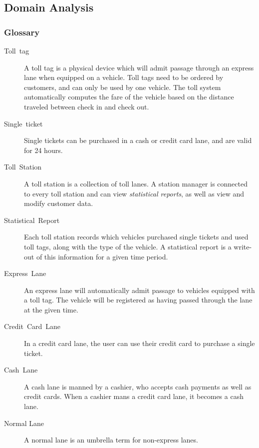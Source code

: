 \subsection {Domain Analysis}

\subsubsection {Glossary}

\begin{description}
\item [{Toll~tag}] A toll tag is a physical device which will admit passage
through an express lane when equipped on a vehicle. Toll tags need
to be ordered by customers, and can only be used by one vehicle. The
toll system automatically computes the fare of the vehicle based on
the distance traveled between check in and check out.

\item [{Single~ticket}] Single tickets can be purchased in a cash or credit
card lane, and are valid for 24 hours.

\item [{Toll~Station}] A toll station is a collection of toll lanes. A
station manager is connected to every toll station and can view \emph{statistical
reports}, as well as view and modify customer data.

\item [{Statistical~Report}] Each toll station records which vehicles
purchased single tickets and used toll tags, along with the type of
the vehicle. A statistical report is a write-out of this information
for a given time period.

\item [{Express~Lane}] An express lane will automatically admit passage
to vehicles equipped with a toll tag. The vehicle will be registered
as having passed through the lane at the given time.

\item [{Credit~Card~Lane}] In a credit card lane, the user can use their
credit card to purchase a single ticket.

\item [{Cash~Lane}] A cash lane is manned by a cashier, who accepts cash
payments as well as credit cards. When a cashier mans a credit card
lane, it becomes a cash lane.

\item [{Normal Lane}] A normal lane is an umbrella term for non-express lanes.


\end{description}
